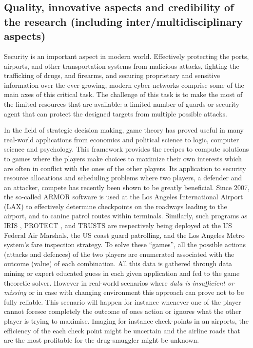 
\subsection{Quality, innovative aspects and credibility of the research (including inter/multidisciplinary aspects)}
\label{sec:quality}


Security is an important aspect in modern world.
Effectively protecting the ports, airports, and other transportation systems from malicious attacks,
fighting the trafficking of drugs, and firearms, and securing proprietary and sensitive information over the ever-growing, modern cyber-networks comprise some of the main axes of this critical task. The challenge of this task is to make the most of the limited resources that are  available: a limited number of guards or security agent that can protect the designed targets from multiple possible attacks.

In the field of strategic decision making, game theory has proved useful in many real-world applications from economics and political science to logic, computer science and psychology. This framework provides the recipes to compute solutions to games where the players make choices to maximize their own interests which are often in conflict with the ones of the other players. 
Its application to security resource allocations and scheduling problems where two players, a defender and an attacker, compete  has recently been shown to be greatly beneficial.
Since 2007, the so-called ARMOR software \cite{pita2008deployed} is used at the Los Angeles International Airport (LAX) to effectively determine 
checkpoints on the roadways leading to the airport, and to canine patrol routes within terminals. 
Similarly, such programs as IRIS \cite{tsai2009iris}, PROTECT \cite{shieh2012protect}, and TRUSTS \cite{yin2012trusts} are respectively being deployed at the US Federal Air Marshals, the US coast guard patrolling, and the Los Angeles Metro system's fare inspection strategy. To solve these ``games'', all the possible actions (attacks and defences) of the two players are enumerated associated with the outcome (value) of each combination. All this data is gathered through data mining or expert educated guess in each given application and fed to the game theoretic solver. However in real-world scenarios where \textit{data is insufficient or missing} or in case with changing environment this approach can prove not to be fully reliable. This scenario will happen for instance whenever one of the player cannot foresee completely the outcome of ones action or ignores what the other player is trying to maximise. Imaging for instance check-points in an airports, the efficiency of the each check point might be uncertain and the airline roads that are the most profitable for the drug-smuggler might be unknown.

